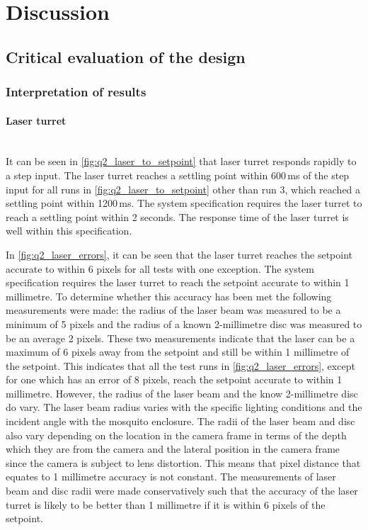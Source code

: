 
\section{Discussion}

\subsection{Critical evaluation of the design}

\subsubsection{Interpretation of results}
\paragraph{Laser turret}\hfill\\
It can be seen in \autoref{fig:q2_laser_to_setpoint} that laser turret responds rapidly to a step input. The laser turret reaches a settling point within 600\,ms of the step input for all runs in \autoref{fig:q2_laser_to_setpoint} other than run 3, which reached a settling point within 1200\,ms. The system specification requires the laser turret to reach a settling point within 2 seconds. The response time of the laser turret is well within this specification.

In \autoref{fig:q2_laser_errors}, it can be seen that the laser turret reaches the setpoint accurate to within 6 pixels for all tests with one exception. The system specification requires the laser turret to reach the setpoint accurate to within 1 millimetre. To determine whether this accuracy has been met the following measurements were made: the radius of the laser beam was measured to be a minimum of 5 pixels and the radius of a known 2-millimetre disc was measured to be an average 2 pixels. These two measurements indicate that the laser can be a maximum of 6 pixels away from the setpoint and still be within 1 millimetre of the setpoint. This indicates that all the test runs in \autoref{fig:q2_laser_errors}, except for one which has an error of 8 pixels, reach the setpoint accurate to within 1 millimetre. However, the radius of the laser beam and the know 2-millimetre disc do vary. The laser beam radius varies with the specific lighting conditions and the incident angle with the mosquito enclosure. The radii of the laser beam and disc also vary depending on the location in the camera frame in terms of the depth which they are from the camera and the lateral position in the camera frame since the camera is subject to lens distortion. This means that pixel distance that equates to 1 millimetre accuracy is not constant. The measurements of laser beam and disc radii were made conservatively such that the accuracy of the laser turret is likely to be better than 1 millimetre if it is within 6 pixels of the setpoint.

